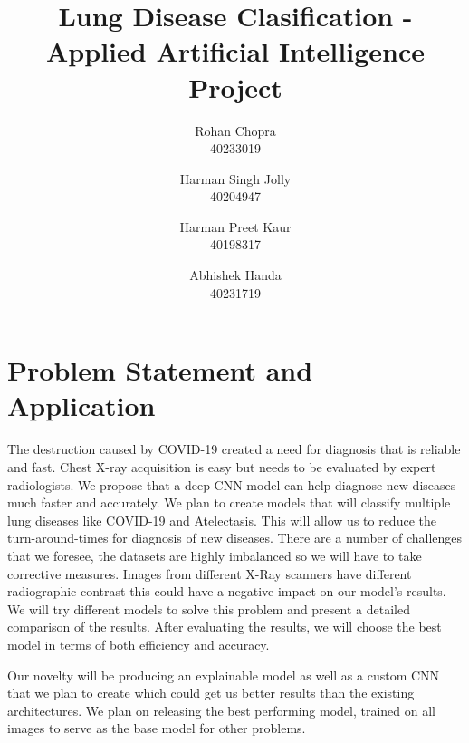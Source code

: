 \documentclass[10pt,twocolumn,letterpaper]{article}
\def\subName{Applied Artificial Intelligence }
\begin{document}

\def\cvprPaperID{Group-Q} %
\def\confName{COMP6721}
\def\confYear{2022}

\title{Lung Disease Clasification - \subName Project}

\author{Rohan Chopra\\
\small 40233019\\
\and
Harman Singh Jolly\\
\small 40204947\\
\and
Harman Preet Kaur\\
\small 40198317\\
\and
Abhishek Handa\\
\small 40231719\\
}
\maketitle
\section{Problem Statement and Application}
\label{sec:intro}
The destruction caused by COVID-19 created a need for diagnosis 
that is reliable and fast\cite{vandenberg2021considerations}. Chest 
X-ray acquisition is easy but needs to be evaluated by expert 
radiologists\cite{xrayread}. We propose that a deep CNN model can help 
diagnose new diseases much 
faster and accurately. We plan to create models that will 
classify multiple lung diseases like COVID-19 and 
Atelectasis. This will allow us to reduce the turn-around-times 
for diagnosis of new diseases. 
There are a number of challenges that we foresee, the datasets 
are highly imbalanced so we will have to take corrective measures. Images 
from different X-Ray scanners have different radiographic contrast 
\cite{andrew2022rad} this could have a negative impact on our model's results. 
We will try different models to solve this problem and present a 
detailed comparison of the results. After evaluating the results, 
we will choose the best model in terms of both efficiency and 
accuracy. 

Our novelty will be producing an explainable model as well as 
a custom CNN that we plan to create which could get us better 
results than the existing architectures. We plan on releasing
the best performing model, trained on all images to  
serve as the base model for other problems.
\end{document}
